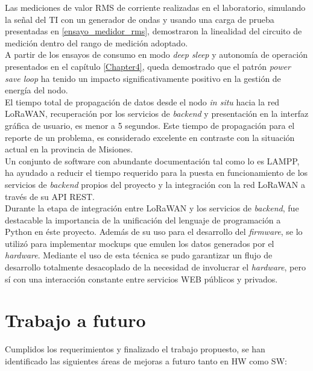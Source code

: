 Las mediciones de valor RMS de corriente realizadas en el laboratorio, simulando la señal del TI con un generador de ondas y usando una carga de prueba presentadas en \ref{ensayo_medidor_rms}, demostraron la linealidad del circuito de medición dentro del rango de medición adoptado.\\
A partir de los ensayos de consumo en modo \textit{deep sleep} y autonomía de operación presentados en el capítulo \ref{Chapter4}, queda demostrado que el patrón \textit{power save loop} ha tenido un impacto significativamente positivo en la gestión de energía del nodo.\\
El tiempo total de propagación de datos desde el nodo \textit{in situ} hacia la red LoRaWAN, recuperación por los servicios de \textit{backend} y presentación en la interfaz gr\'{a}fica de usuario, es menor a 5 segundos. Este tiempo de propagación para el reporte de un problema, es considerado excelente en contraste con la situación actual en la provincia de Misiones.\\
Un conjunto de software con abundante documentación tal como lo es LAMPP, ha ayudado a reducir el tiempo requerido para la puesta en funcionamiento de los servicios de \textit{backend} propios del proyecto y la integración con la red LoRaWAN a través de su API REST.\\
Durante la etapa de integración entre LoRaWAN y los servicios de \textit{backend}, fue destacable la importancia de la unificación del lenguaje de programación a Python en \'{e}ste proyecto. Además de su uso para el desarrollo del \textit{firmware}, se lo utilizó para implementar mockups que emulen los datos generados por el \textit{hardware}. Mediante el uso de esta técnica se pudo garantizar un flujo de desarrollo totalmente desacoplado de la necesidad de involucrar el \textit{hardware}, pero sí con una interacción constante entre servicios WEB públicos y privados.\\


\section{Trabajo a futuro}

Cumplidos los requerimientos y finalizado el trabajo propuesto, se han identificado las siguientes áreas de mejoras a futuro tanto en HW como SW:

